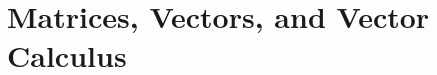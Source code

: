 \documentclass[a4paper]{article}
\begin{document}
    \section{Matrices, Vectors, and Vector Calculus}
    \addtocounter{subsection}{10}
    
    
    
    
    
    
    
\end{document}
